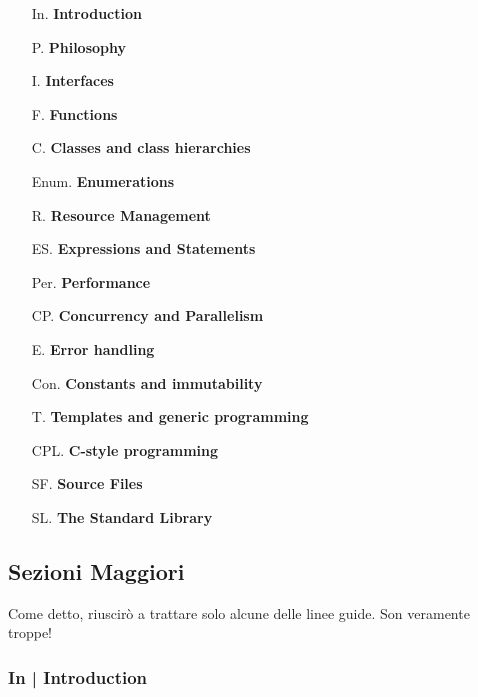 \begin{multicols}{2}
	\begin{itemize}
		\item[In.] \textsf{\small \textbf{Introduction} }
		\item[P.] \textsf{\small \textbf{Philosophy} }
		\item[I.] \textsf{\small \textbf{Interfaces} }
		\item[F.] \textsf{\small \textbf{Functions} }
		\item[C.] \textsf{\small \textbf{Classes and class hierarchies} }
		\item[Enum.] \textsf{\small \textbf{Enumerations} }
		\item[R.] \textsf{\small \textbf{Resource Management} }
		\item[ES.] \textsf{\small \textbf{Expressions and Statements} }
		\item[Per.] \textsf{\small \textbf{Performance} }
		\item[CP.] \textsf{\small \textbf{Concurrency and Parallelism} }
		\item[E.] \textsf{\small \textbf{Error handling} }
		\item[Con.] \textsf{\small \textbf{Constants and immutability} }
		\item[T.] \textsf{\small \textbf{Templates and generic programming} }
		\item[CPL.] \textsf{\small \textbf{C-style programming} }
		\item[SF.] \textsf{\small \textbf{Source Files} }
		\item[SL.] \textsf{\small \textbf{The Standard Library} }
	\end{itemize}
\end{multicols}

\subsection{Sezioni Maggiori}


\textsf{\small Come detto, riuscirò a trattare solo alcune delle linee guide. Son veramente troppe!} \break


\subsubsection{In | Introduction}


